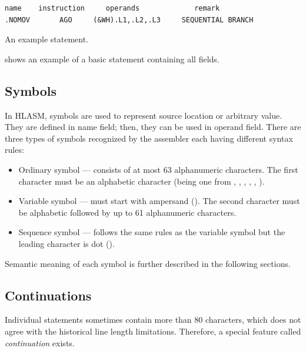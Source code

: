 \begin{listing}[t]
	\begin{verbatim}
name    instruction     operands             remark
.NOMOV       AGO     (&WH).L1,.L2,.L3     SEQUENTIAL BRANCH
	\end{verbatim}
	\caption{An example statement.}
	\label{lst:small_example}
\end{listing}

 shows an example of a basic statement containing all fields.

\subsection{Symbols}

In HLASM, symbols are used to represent source location or arbitrary value. They are defined in name field; then, they can be used in operand field. There are three types of symbols recognized by the assembler each having different syntax rules:

\begin{itemize}
	\item Ordinary symbol --- consists of at most 63 alphanumeric characters. The first character must be an alphabetic character (being one from , , , \TT{\#}, \TT{\$}, \TT{\_}).
	
	
	\item Variable symbol --- must start with ampersand (\TT{\&}). The second character must be alphabetic followed by up to 61 alphanumeric characters. 
	
	
	\item Sequence symbol --- follows the same rules as the variable symbol but the leading character is dot ().
	
\end{itemize}

Semantic meaning of each symbol is further described in the following sections.

\subsection{Continuations}
\label{Continuation}

Individual statements sometimes contain more than 80 characters, which does not agree with the historical line length limitations. Therefore, a special feature called \emph{continuation} exists.

